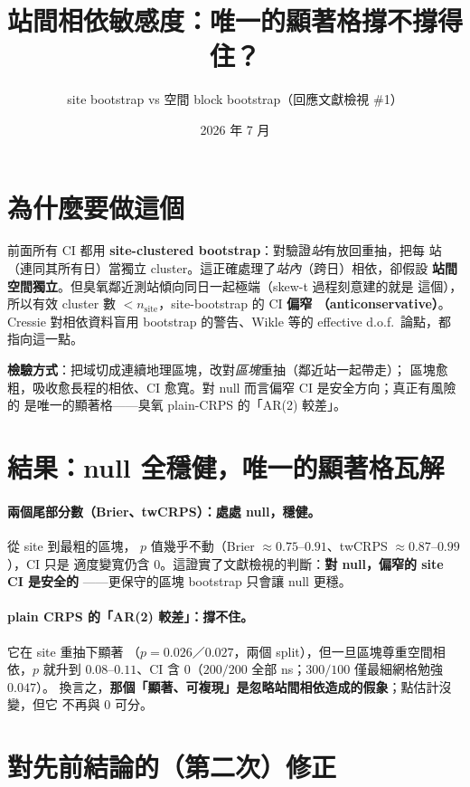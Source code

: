 \documentclass[12pt]{article}
\title{\textbf{站間相依敏感度：唯一的顯著格撐不撐得住？}}
\author{site bootstrap vs 空間 block bootstrap（回應文獻檢視 \#1）}
\date{2026 年 7 月}
\begin{document}
\maketitle

\section*{為什麼要做這個}

前面所有 CI 都用 \textbf{site-clustered bootstrap}：對驗證\emph{站}有放回重抽，把每
站（連同其所有日）當獨立 cluster。這正確處理了\emph{站內}（跨日）相依，卻假設
\textbf{站間空間獨立}。但臭氧鄰近測站傾向同日一起極端（skew-t 過程刻意建的就是
這個），所以有效 cluster 數 $<n_{\mathrm{site}}$，site-bootstrap 的 CI \textbf{偏窄
（anticonservative）}。Cressie 對相依資料盲用 bootstrap 的警告、Wikle 等的
effective d.o.f.\ 論點，都指向這一點。

\textbf{檢驗方式}：把域切成連續地理區塊，改對\emph{區塊}重抽（鄰近站一起帶走）；
區塊愈粗，吸收愈長程的相依、CI 愈寬。對 null 而言偏窄 CI 是安全方向；真正有風險的
是唯一的顯著格——臭氧 plain-CRPS 的「AR(2) 較差」。

\bigskip


\section*{結果：null 全穩健，唯一的顯著格瓦解}

\paragraph{兩個尾部分數（Brier、twCRPS）：處處 null，穩健。}從 site 到最粗的區塊，
$p$ 值幾乎不動（Brier $\approx0.75$--$0.91$、twCRPS $\approx0.87$--$0.99$），CI 只是
適度變寬仍含 $0$。這證實了文獻檢視的判斷：\textbf{對 null，偏窄的 site CI 是安全的}
——更保守的區塊 bootstrap 只會讓 null 更穩。

\paragraph{plain CRPS 的「AR(2) 較差」：撐不住。}它在 site 重抽下顯著
（$p=0.026$／$0.027$，兩個 split），但一旦區塊尊重空間相依，$p$ 就升到
$0.08$--$0.11$、CI 含 $0$（$200/200$ 全部 ns；$300/100$ 僅最細網格勉強 $0.047$）。
換言之，\textbf{那個「顯著、可複現」是忽略站間相依造成的假象}；點估計沒變，但它
不再與 $0$ 可分。

\section*{對先前結論的（第二次）修正}
\end{document}
